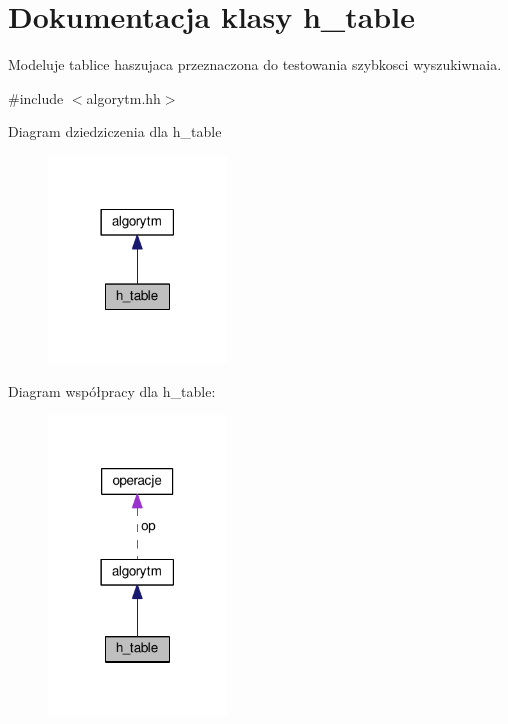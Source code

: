 \hypertarget{classh__table}{\section{Dokumentacja klasy h\-\_\-table}
\label{classh__table}
}


Modeluje tablice haszujaca przeznaczona do testowania szybkosci wyszukiwnaia.  




{\ttfamily \#include $<$algorytm.\-hh$>$}



Diagram dziedziczenia dla h\-\_\-table\nopagebreak
\begin{figure}[H]
\begin{center}
\leavevmode
\includegraphics[width=134pt]{classh__table__inherit__graph}
\end{center}
\end{figure}


Diagram współpracy dla h\-\_\-table\-:\nopagebreak
\begin{figure}[H]
\begin{center}
\leavevmode
\includegraphics[width=134pt]{classh__table__coll__graph}
\end{center}
\end{figure}

